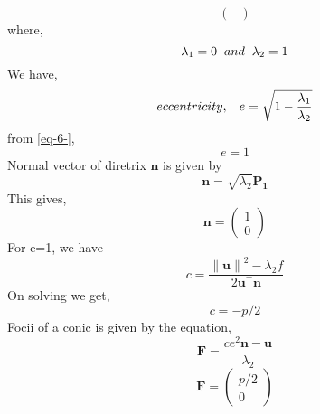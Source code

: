 \documentclass[10pt,a4paper]{report}
\providecommand{\norm}[1]{\left\lVert#1\right\rVert}
\newcommand{\myvec}[1]{\ensuremath{\begin{pmatrix}#1\end{pmatrix}}}
\let\vec\mathbf
\let\vec\mathbf
\begin{document}
\begin{multicols}{2}
\begin{equation}
\begin{pmatrix}
 \end{pmatrix}                                                                      
\label{eq-5-}
\end{equation}
where,
  \begin{equation}
  \lambda_1 = 0 \hspace{2mm} and \hspace{2mm} \lambda_2 = 1
  \label{eq-6-}
  \end{equation}
  We have,
  \begin{equation}
  eccentricity, \hspace{3mm} e = \sqrt{1-\frac{\lambda_1}{\lambda_2}}
  \label{eq-7-}
  \end{equation}
  from \eqref{eq-6-},
  \begin{equation}                                                                             e =1
  \label{eq-8-}         
  \end{equation}
  Normal vector of diretrix $\vec{n}$ is given by                                              \begin{equation}                                                                    
\vec{n} = \sqrt{\lambda_2}\vec{P_1}
  \label{eq-9-}
  \end{equation}
  This gives,
  \begin{equation}
  \vec{n} = \myvec{1 \\ 0}
  \label{eq-10-}
  \end{equation}
  For e=1, we have
  \begin{equation}
c=\frac{\norm{\vec{u}}^2 - \lambda_2 f   }{2\vec{u}^{\top}\vec{n}}
  \end{equation}
  On solving we get,
\begin{equation}
 c =  -p/2
\end{equation}
  Focii of a conic is given by the equation,
 \begin{equation}                                                                      
 \vec{F} = \frac{ce^2\vec{n}-\vec{u}}{\lambda_2}                                         
 \label{eq-13-}                                                                          
 \end{equation}
 \begin{equation}                                                                       
 \vec{F} =    \myvec{p/2 \\ 0}                                                        
 \label{eq-14-}                                                                         

\end{equation}
\end{multicols}
\end{document}
